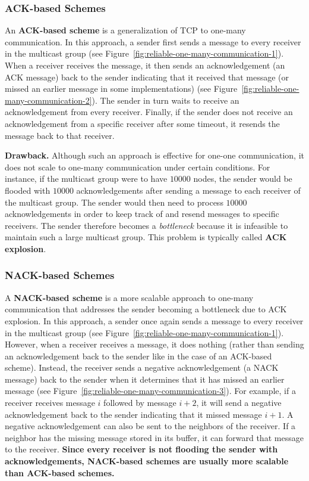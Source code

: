 \documentclass[twoside]{article}
\begin{document}
\subsubsection{ACK-based Schemes}

An \textbf{ACK-based scheme} is a generalization of TCP to one-many communication. In this approach, a sender first sends a message to every receiver in the multicast group (see Figure~\ref{fig:reliable-one-many-communication-1}). When a receiver receives the message, it then sends an acknowledgement (an {\ttfamily ACK} message) back to the sender indicating that it received that message (or missed an earlier message in some implementations) (see Figure~\ref{fig:reliable-one-many-communication-2}). The sender in turn waits to receive an acknowledgement from every receiver. Finally, if the sender does not receive an acknowledgement from a specific receiver after some timeout, it resends the message back to that receiver.

\textbf{Drawback.} Although such an approach is effective for one-one communication, it does not scale to one-many communication under certain conditions. For instance, if the multicast group were to have $10000$ nodes, the sender would be flooded with $10000$ acknowledgements after sending a message to each receiver of the multicast group. The sender would then need to process $10000$ acknowledgements in order to keep track of and resend messages to specific receivers. The sender therefore becomes a \emph{bottleneck} because it is infeasible to maintain such a large multicast group. This problem is typically called \textbf{ACK explosion}.

\subsubsection{NACK-based Schemes}

A \textbf{NACK-based scheme} is a more scalable approach to one-many communication that addresses the sender becoming a bottleneck due to ACK explosion. In this approach, a sender once again sends a message to every receiver in the multicast group (see Figure~\ref{fig:reliable-one-many-communication-1}). However, when a receiver receives a message, it does nothing (rather than sending an acknowledgement back to the sender like in the case of an ACK-based scheme). Instead, the receiver sends a negative acknowledgement (a {\ttfamily NACK} message) back to the sender when it determines that it has missed an earlier message (see Figure~\ref{fig:reliable-one-many-communication-3}). For example, if a receiver receives message $i$ followed by message $i + 2$, it will send a negative acknowledgement back to the sender indicating that it missed message $i + 1$. A negative acknowledgement can also be sent to the neighbors of the receiver. If a neighbor has the missing message stored in its buffer, it can forward that message to the receiver. \textbf{Since every receiver is not flooding the sender with acknowledgements, NACK-based schemes are usually more scalable than ACK-based schemes.}
\end{document}
